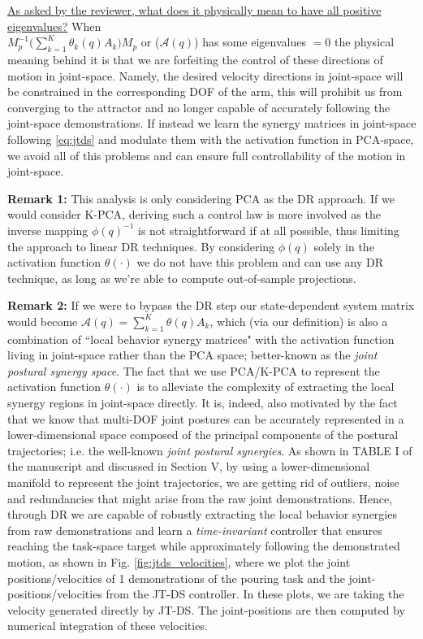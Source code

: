 \documentclass{article}
\begin{document}
\noindent \underline{As asked by the reviewer, what does it physically mean to have all positive eigenvalues?}  When \\ $M_p^{-1}\big(\sum_{k=1}^{K}\theta_k(q)A_k\big)M_p$  or ($\mathcal{A}(q)$) has some eigenvalues $=0$ the physical meaning behind it is that we are forfeiting the control of these directions of motion in joint-space. Namely, the desired velocity directions in joint-space will be constrained in the corresponding DOF of the arm, this will prohibit us from converging to the attractor and no longer capable of accurately following the joint-space demonstrations.  If instead we learn the synergy matrices in joint-space following \eqref{eq:jtds} and modulate them with the activation function in PCA-space, we avoid all of this problems and can ensure full controllability of the motion in joint-space. 

\noindent \textbf{Remark 1:} This analysis is only considering PCA as the DR approach. If we would consider K-PCA, deriving such a control law is more involved as the inverse mapping $\phi(q)^{-1}$ is not straightforward if at all possible, thus limiting the approach to linear DR techniques. By considering $\phi(q)$ solely in the activation function $\theta(\cdot)$ we do not have this problem and can use any DR technique, as long as we're able to compute out-of-sample projections.

\noindent \textbf{Remark 2:} If we were to bypass the DR step our state-dependent system matrix would become $\mathcal{A}(q)= \sum\limits_{k=1}^{K}\theta(q)A_k$, which (via our definition) is also a combination of ``local behavior synergy matrices" with the activation function living in joint-space rather than the PCA space; better-known as the \textit{joint postural synergy space}. The fact that we use PCA/K-PCA to represent the activation function $\theta(\cdot)$ is to alleviate the complexity of extracting the local synergy regions in joint-space directly. It is, indeed, also motivated by the fact that we know that multi-DOF joint postures can be accurately represented in a lower-dimensional space composed of the principal components of the postural trajectories; i.e. the well-known \textit{joint postural synergies}. As shown in TABLE I of the manuscript and discussed in Section V, by using a lower-dimensional manifold to represent the joint trajectories, we are getting rid of outliers, noise and redundancies that might arise from the raw joint demonstrations. Hence, through DR we are capable of robustly extracting the local behavior synergies from raw demonstrations and learn a \textit{time-invariant} controller that ensures reaching the task-space target while approximately following the demonstrated motion, as shown in Fig. \ref{fig:jtds_velocities}, where we plot the joint positions/velocities of 1 demonstrations of the pouring task and the joint-positions/velocities from the JT-DS controller. In these plots, we are taking the velocity generated directly by JT-DS. The joint-positions are then computed by numerical integration of these velocities. 
\end{document}
